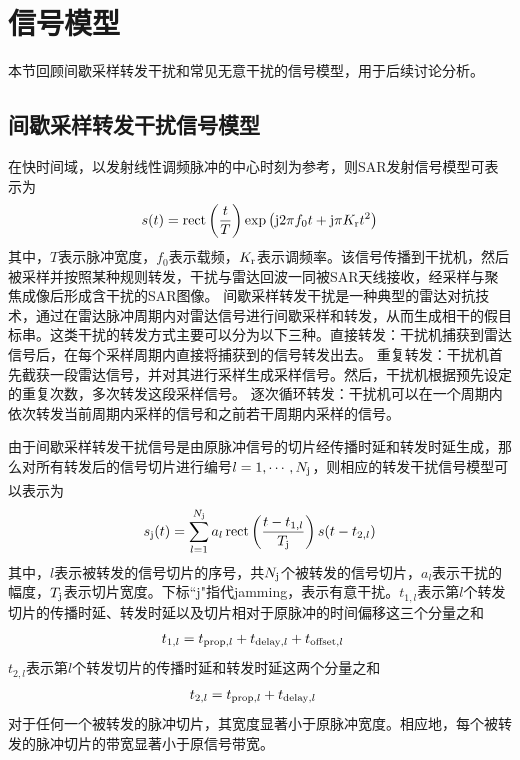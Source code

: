 \documentclass[10.5pt,UTF8]{JR}
\theoremstyle{mystyle}
\newcommand{\upcite}[1]{\textsuperscript{\cite{#1}}}
\begin{document}
\section{信号模型}

本节回顾间歇采样转发干扰和常见无意干扰的信号模型，用于后续讨论分析。

\subsection{间歇采样转发干扰信号模型}

在快时间域，以发射线性调频脉冲的中心时刻为参考，则SAR发射信号模型可表示为
\begin{equation}
    s(t)={\rm rect}\left(\frac{t}{T}\right)\exp\left(\mathrm{j}2\pi f_0t+\mathrm{j}\pi K_\mathrm{r}t^2\right)
\end{equation}
其中，$T$表示脉冲宽度，$f_0$表示载频，$K_{\rm r}$表示调频率。该信号传播到干扰机，然后被采样并按照某种规则转发，干扰与雷达回波一同被SAR天线接收，经采样与聚焦成像后形成含干扰的SAR图像。
间歇采样转发干扰是一种典型的雷达对抗技术，通过在雷达脉冲周期内对雷达信号进行间歇采样和转发，从而生成相干的假目标串。这类干扰的转发方式主要可以分为以下三种。直接转发：干扰机捕获到雷达信号后，在每个采样周期内直接将捕获到的信号转发出去。
重复转发：干扰机首先截获一段雷达信号，并对其进行采样生成采样信号。然后，干扰机根据预先设定的重复次数，多次转发这段采样信号。
逐次循环转发：干扰机可以在一个周期内依次转发当前周期内采样的信号和之前若干周期内采样的信号。
 
由于间歇采样转发干扰信号是由原脉冲信号的切片经传播时延和转发时延生成，那么对所有转发后的信号切片进行编号$l=1,\cdots,N_{\rm j}$，则相应的转发干扰信号模型可以表示为\upcite{wang2006js}
\begin{equation}
    s_{\rm j}(t)=\sum_{l=1}^{N_{\rm j}} a_l\operatorname{rect}\left(\frac{t-t_{1,l}}{T_{\rm j}}\right)s(t-t_{2,l})
\end{equation}
其中，$l$表示被转发的信号切片的序号，共$N_{\rm j}$个被转发的信号切片，$a_l$表示干扰的幅度，$T_{\rm j}$表示切片宽度。下标``j"指代jamming，表示有意干扰。$t_{1,l}$表示第$l$个转发切片的传播时延、转发时延以及切片相对于原脉冲的时间偏移这三个分量之和
\begin{align}\label{}
t_{1,l} &= t_{{\rm prop},l}+t_{{\rm delay},l}+t_{{\rm offset},l}
\end{align}
$t_{2,l}$表示第$l$个转发切片的传播时延和转发时延这两个分量之和
\begin{align}\label{}
t_{2,l} &= t_{{\rm prop},l}+t_{{\rm delay},l}
\end{align}
对于任何一个被转发的脉冲切片，其宽度显著小于原脉冲宽度。相应地，每个被转发的脉冲切片的带宽显著小于原信号带宽。
\end{document}
